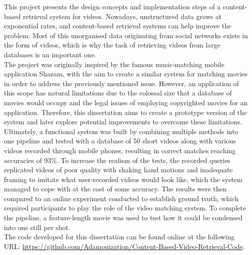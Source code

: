 This project presents the design concepts and implementation steps of a content-based retrieval system for videos. Nowadays, unstructured data grows at exponential rates, and content-based retrieval systems can help improve the problem. Most of this unorganised data originating from social networks exists in the form of videos, which is why the task of retrieving videos from large databases is an important one.\\

The project was originally inspired by the famous music-matching mobile application Shazam, with the aim to create a similar system for matching movies in order to address the previously mentioned issue. However, an application of this scope has natural limitations due to the colossal size that a database of movies would occupy and the legal issues of employing copyrighted movies for an application. Therefore, this dissertation aims to create a prototype version of the system and later explore potential improvements to overcome these limitations.\\

Ultimately, a functional system was built by combining multiple methods into one pipeline and tested with a database of 50 short videos along with various videos recorded through mobile phones, resulting in correct matches reaching accuracies of 93\%. To increase the realism of the tests, the recorded queries replicated videos of poor quality with shaking hand motions and inadequate framing to imitate what user-recorded videos would look like, which the system managed to cope with at the cost of some accuracy. The results were then compared to an online experiment conducted to establish ground truth, which required participants to play the role of the video matching system. To complete the pipeline, a feature-length movie was used to test how it could be condensed into one still per shot.\\

The code developed for this dissertation can be found online at the following URL: \url{https://github.com/Adamouization/Content-Based-Video-Retrieval-Code}.